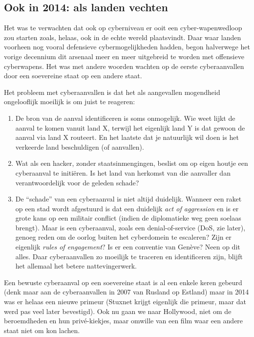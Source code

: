 \documentclass[
  10pt,
  dutch,
  paper=a4,
  ,captions=tableheading
]{scrbook}
\providecommand{\tightlist}{%
  \setlength{\itemsep}{0pt}\setlength{\parskip}{0pt}}
\begin{document}
\subsection{Ook in 2014: als landen
vechten}\label{ook-in-2014-als-landen-vechten}

Het was te verwachten dat ook op cyberniveau er ooit een
cyber-wapenwedloop zou starten zoals, helaas, ook in de echte wereld
plaatsvindt. Daar waar landen voorheen nog vooral defensieve
cybermogelijkheden hadden, begon halverwege het vorige decennium dit
arsenaal meer en meer uitgebreid te worden met offensieve cyberwapens.
Het was met andere woorden wachten op de eerste cyberaanvallen door een
soevereine staat op een andere staat.

Het probleem met cyberaanvallen is dat het als aangevallen mogendheid
ongelooflijk moeilijk is om juist te reageren:

\begin{enumerate}
\def\labelenumi{\arabic{enumi}.}
\tightlist
\item
  De bron van de aanval identificeren is soms onmogelijk. Wie weet lijkt
  de aanval te komen vanuit land X, terwijl het eigenlijk land Y is dat
  gewoon de aanval via land X routeert. En het laatste dat je natuurlijk
  wil doen is het verkeerde land beschuldigen (of aanvallen).
\item
  Wat als een hacker, zonder staatsinmengingen, beslist om op eigen
  houtje een cyberaanval te initiëren. Is het land van herkomst van die
  aanvaller dan verantwoordelijk voor de geleden schade?
\item
  De ``schade'' van een cyberaanval is niet altijd duidelijk. Wanneer
  een raket op een stad wordt afgestuurd is dat een duidelijk \emph{act
  of aggression} en is er grote kans op een militair conflict (indien de
  diplomatieke weg geen soelaas brengt). Maar is een cyberaanval, zoals
  een denial-of-service (DoS, zie later), genoeg reden om de oorlog
  buiten het cyberdomein te escaleren? Zijn er eigenlijk \emph{rules of
  engagement}? Is er een conventie van Genève? Neen op dit alles. Daar
  cyberaanvallen zo moeilijk te traceren en identificeren zijn, blijft
  het allemaal het betere nattevingerwerk.
\end{enumerate}

Een bewuste cyberaanval op een soevereine staat is al een enkele keren
gebeurd (denk maar aan de cyberaanvallen in 2007 van Rusland op Estland)
maar in 2014 was er helaas een nieuwe primeur (Stuxnet krijgt eigenlijk
die primeur, maar dat werd pas veel later bevestigd). Ook nu gaan we
naar Hollywood, niet om de beroemdheden en hun privé-kiekjes, maar
omwille van een film waar een andere staat niet om kon lachen.
\end{document}
